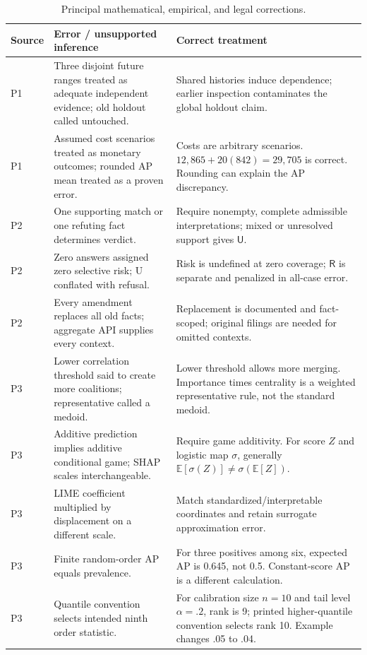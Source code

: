 \documentclass[11pt,a4paper]{article}
\newcommand{\Ulabel}{\mathsf{U}}
\newcommand{\Rlabel}{\mathsf{R}}
\begin{document}
\begin{table}[H]\caption{Principal mathematical, empirical, and legal corrections.}
\footnotesize\begin{tabularx}{\linewidth}{p{.14\linewidth}YY}\toprule
Source & Error / unsupported inference & Correct treatment\\\midrule
P1 & Three disjoint future ranges treated as adequate independent evidence; old holdout called untouched. & Shared histories induce dependence; earlier inspection contaminates the global holdout claim.\\
P1 & Assumed cost scenarios treated as monetary outcomes; rounded AP mean treated as a proven error. & Costs are arbitrary scenarios. $12{,}865+20(842)=29{,}705$ is correct. Rounding can explain the AP discrepancy.\\
P2 & One supporting match or one refuting fact determines verdict. & Require nonempty, complete admissible interpretations; mixed or unresolved support gives $\Ulabel$.\\
P2 & Zero answers assigned zero selective risk; U conflated with refusal. & Risk is undefined at zero coverage; $\Rlabel$ is separate and penalized in all-case error.\\
P2 & Every amendment replaces all old facts; aggregate API supplies every context. & Replacement is documented and fact-scoped; original filings are needed for omitted contexts.\\
P3 & Lower correlation threshold said to create more coalitions; representative called a medoid. & Lower threshold allows more merging. Importance times centrality is a weighted representative rule, not the standard medoid.\\
P3 & Additive prediction implies additive conditional game; SHAP scales interchangeable. & Require game additivity. For score $Z$ and logistic map $\sigma$, generally $\mathbb E[\sigma(Z)]\ne\sigma(\mathbb E[Z])$.\\
P3 & LIME coefficient multiplied by displacement on a different scale. & Match standardized/interpretable coordinates and retain surrogate approximation error.\\
P3 & Finite random-order AP equals prevalence. & For three positives among six, expected AP is 0.645, not 0.5. Constant-score AP is a different calculation.\\
P3 & Quantile convention selects intended ninth order statistic. & For calibration size $n=10$ and tail level $\alpha=.2$, rank is 9; printed higher-quantile convention selects rank 10. Example changes .05 to .04.\\

\end{tabularx}
\end{table}
\end{document}
